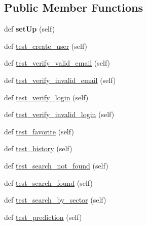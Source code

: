 \subsection*{Public Member Functions}
\begin{DoxyCompactItemize}
\item 
\mbox{\label{classprodigal__app_1_1test__backend_1_1_user_test_case_a52cc08d8d47df13f1dbb416e48b6cb03}} 
def {\bfseries set\+Up} (self)
\item 
def \mbox{\hyperlink{classprodigal__app_1_1test__backend_1_1_user_test_case_a087483deb4f6ec707a837434a2ff23b1}{test\+\_\+create\+\_\+user}} (self)
\item 
def \mbox{\hyperlink{classprodigal__app_1_1test__backend_1_1_user_test_case_adb1ca421e78a76b4530658b96632e0a6}{test\+\_\+verify\+\_\+valid\+\_\+email}} (self)
\item 
def \mbox{\hyperlink{classprodigal__app_1_1test__backend_1_1_user_test_case_a830bb48e5c7c62bc4629d97c7e5968fd}{test\+\_\+verify\+\_\+invalid\+\_\+email}} (self)
\item 
def \mbox{\hyperlink{classprodigal__app_1_1test__backend_1_1_user_test_case_a64c49e18be59c5b85f787cd1b34614ee}{test\+\_\+verify\+\_\+login}} (self)
\item 
def \mbox{\hyperlink{classprodigal__app_1_1test__backend_1_1_user_test_case_a60f9e3232bbb5fd501af865739c1d5f4}{test\+\_\+verify\+\_\+invalid\+\_\+login}} (self)
\item 
def \mbox{\hyperlink{classprodigal__app_1_1test__backend_1_1_user_test_case_ae4a2b552853d75363cef33b040f5e62e}{test\+\_\+favorite}} (self)
\item 
def \mbox{\hyperlink{classprodigal__app_1_1test__backend_1_1_user_test_case_a7f29c26178f1e4e81049741af0273be4}{test\+\_\+history}} (self)
\item 
def \mbox{\hyperlink{classprodigal__app_1_1test__backend_1_1_user_test_case_a61a99690ab5ae9bfcde3fd3229724acf}{test\+\_\+search\+\_\+not\+\_\+found}} (self)
\item 
def \mbox{\hyperlink{classprodigal__app_1_1test__backend_1_1_user_test_case_a972274b7924ec4a10d3ee0e8b7516e80}{test\+\_\+search\+\_\+found}} (self)
\item 
def \mbox{\hyperlink{classprodigal__app_1_1test__backend_1_1_user_test_case_a45d92dd138deb0ff84a3d4b0ca6ad723}{test\+\_\+search\+\_\+by\+\_\+sector}} (self)
\item 
def \mbox{\hyperlink{classprodigal__app_1_1test__backend_1_1_user_test_case_ac09074acaa827e0ec5f437ecf2082eb9}{test\+\_\+prediction}} (self)
\end{DoxyCompactItemize}
